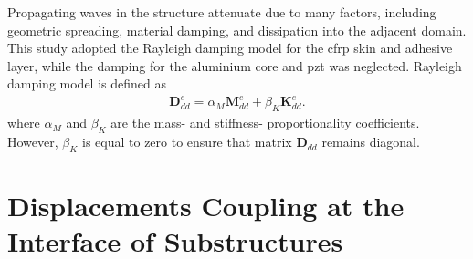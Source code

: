 \documentclass[11pt,a4paper,final]{report}
\begin{document}
Propagating waves in the structure attenuate due to many factors, including geometric spreading, material damping, and dissipation into the adjacent domain.
This study adopted the Rayleigh damping model for the \ac{cfrp} skin and adhesive layer, while the damping for the aluminium core and \ac{pzt} was neglected.
Rayleigh damping model is defined as \cite{wandowski2017guided}
\begin{eqnarray}
	\textbf{D}_{dd}^e = \alpha_M \textbf{M}_{dd}^e + \beta_K \textbf{K}_{dd}^e.
	\label{eq:damping}
\end{eqnarray}
where \(\alpha_M\) and \(\beta_K\) are the mass- and stiffness- proportionality coefficients. However, \(\beta_K\) is equal to zero to ensure that matrix \(\textbf{D}_{dd}\) remains diagonal. \section{Displacements Coupling at the Interface of Substructures}
\label{sec:interface}
\end{document}
